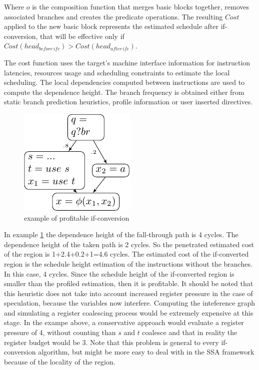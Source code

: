 Where $o$ is the composition function that merges basic blocks together, removes associated branches and creates the predicate operations. The resulting $Cost$ applied to the new basic block represents the estimated schedule after if-conversion, that will be effective only if $Cost(head_{before\,ifc}) > Cost(head_{after\,ifc})$. 
 
The cost function uses the target's machine interface information for instruction latencies, resources usage and scheduling constraints to estimate the local scheduling. The local dependencies computed between instructions are used to compute the dependence height. The branch frequency is obtained either from static branch prediction heuristics, profile information or user inserted directives.
\begin{figure}
    \includegraphics[scale=0.8]{ssa_freq}
\caption{example of profitable if-conversion}
\label{fig:ssa_freq}
\end{figure}

In example \ref{fig:ssa_freq} the dependence height of the fall-through path is 4 cycles. The dependence height of the taken path is 2 cycles. So the penetrated estimated cost of the region is 1+2.4+0.2+1=4.6 cycles. The estimated cost of the if-converted region is the schedule height estimation of the instructions without the branches. In this case, 4 cycles. Since the schedule height of the if-converted region is smaller than the profiled estimation, then it is profitable.
It should be noted that this heuristic does not take into account increased register pressure in the case of speculation, because the variables now interfere. Computing the inteference graph and simulating a register coalescing process would be extremely expensive at this stage. In the exampe above, a conservative approach would evaluate a register pressure of 4, without counting than $s$ and $t$ coalesce and that in reality the register budget would be 3. Note that this problem is general to every if-conversion algorithm, but might be more easy to deal with in the SSA framework because of the locality of the region.

